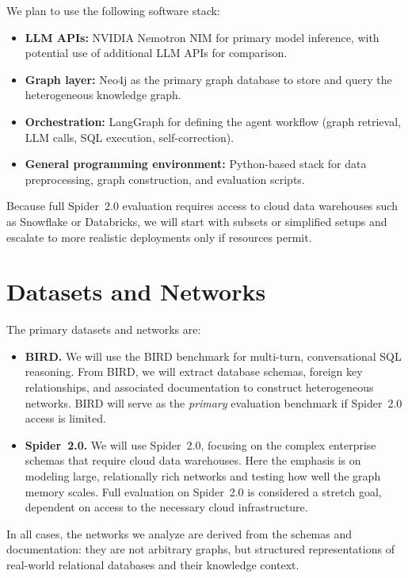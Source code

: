 \documentclass[11pt]{article}
\begin{document}
We plan to use the following software stack:

\begin{itemize}[leftmargin=*]
  \item \textbf{LLM APIs:} NVIDIA Nemotron NIM for primary model inference, with potential use of additional LLM APIs for comparison.
  \item \textbf{Graph layer:} Neo4j as the primary graph database to store and query the heterogeneous knowledge graph.
  \item \textbf{Orchestration:} LangGraph for defining the agent workflow (graph retrieval, LLM calls, SQL execution, self-correction).
  \item \textbf{General programming environment:} Python-based stack for data preprocessing, graph construction, and evaluation scripts.
\end{itemize}

Because full Spider~2.0 evaluation requires access to cloud data warehouses such as Snowflake or Databricks, we will start with subsets or simplified setups and escalate to more realistic deployments only if resources permit.

\section{Datasets and Networks}

The primary datasets and networks are:

\begin{itemize}[leftmargin=*]
  \item \textbf{BIRD.}
  We will use the BIRD benchmark for multi-turn, conversational SQL reasoning.
  From BIRD, we will extract database schemas, foreign key relationships, and associated documentation to construct heterogeneous networks.
  BIRD will serve as the \emph{primary} evaluation benchmark if Spider~2.0 access is limited.
  \item \textbf{Spider~2.0.}
  We will use Spider~2.0, focusing on the complex enterprise schemas that require cloud data warehouses.
  Here the emphasis is on modeling large, relationally rich networks and testing how well the graph memory scales.
  Full evaluation on Spider~2.0 is considered a stretch goal, dependent on access to the necessary cloud infrastructure.
\end{itemize}

In all cases, the networks we analyze are derived from the schemas and documentation: they are not arbitrary graphs, but structured representations of real-world relational databases and their knowledge context.
\end{document}

